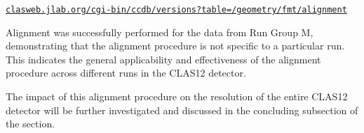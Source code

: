     \small\href{https://clasweb.jlab.org/cgi-bin/ccdb/versions?table=/geometry/fmt/alignment}{\texttt{clasweb.jlab.org/cgi-bin/ccdb/versions?table=/geometry/fmt/alignment}}

    Alignment was successfully performed for the data from Run Group M, demonstrating that the alignment procedure is not specific to a particular run.
    This indicates the general applicability and effectiveness of the alignment procedure across different runs in the CLAS12 detector.

    The impact of this alignment procedure on the resolution of the entire CLAS12 detector will be further investigated and discussed in the concluding subsection of the section.
